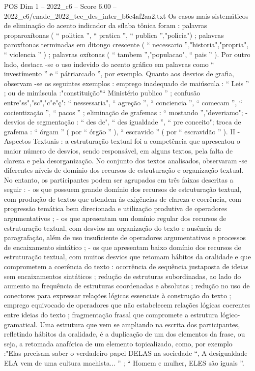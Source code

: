 \begin{textsample}{POS Dim 1 – 2022\_c6 – Score 6.00 – 2022\_c6/enade\_2022\_tec\_des\_inter\_b6c4af2aa2.txt}
Os casos mais sistemáticos de eliminação do acento indicador da sílaba tônica foram : palavras proparoxítonas ( “ politica ”, “ pratica ”, “ publica ”,"policia") ; palavras paroxítonas terminadas em ditongo crescente ( “ necessario ”,"historia","propria", “ violencia ” ) ; palavras oxítonas ( “ tambem ”,"populacao", “ pais ” ).
Por outro lado, destaca -se o uso indevido do acento gráfico em palavras como “ investímento ” e “ pátriarcado ”, por exemplo.
Quanto aos desvios de grafia, observam -se os seguintes exemplos : emprego inadequado de maiúscula : “ Leis ” ; ou de minúscula :"constituição"“ Ministério publico ” ; confusão entre"ss","sc","c"e"ç": “ nessessaria", “ agreção ”, “ conciencia ”, “ comecam ”, “ cocientização ”, “ pacos ” ; eliminação de grafemas : “ mostando ”,"deveriamo"; - desvios de segmentação : “ des de", “ des igualdade ”, “ pre conceito"; troca de grafema : “ órgam ” ( por “ órgão ” ), “ escravido ” ( por “ escravidão ” ).
II - Aspectos Textuais : a estruturação textual foi a competência que apresentou o maior número de desvios, sendo responsável, em alguns textos, pela falta de clareza e pela desorganização.
No conjunto dos textos analisados, observaram -se diferentes níveis de domínio dos recursos de estruturação e organização textual.
No entanto, os participantes podem ser agrupados em três faixas descritas a seguir : - os que possuem grande domínio dos recursos de estruturação textual, com produção de textos que atendem às exigências de clareza e coerência, com progressão temática bem direcionada e utilização produtiva de operadores argumentativos ; - os que apresentam um domínio regular dos recursos de estruturação textual, com desvios na organização do texto e ausência de paragrafação, além de uso insuficiente de operadores argumentativos e processos de encaixamento sintático ; - os que apresentam baixo domínio dos recursos de estruturação textual, com muitos desvios que retomam hábitos da oralidade e que comprometem a coerência do texto : ocorrência de sequência justaposta de ideias sem encaixamentos sintáticos ; redução de estruturas subordinadas, ao lado do aumento na frequência de estruturas coordenadas e absolutas ; redução no uso de conectores para expressar relações lógicas essenciais à construção do texto ; emprego equivocado de operadores que não estabelecem relações lógicas coerentes entre ideias do texto ; fragmentação frasal que compromete a estrutura lógico-gramatical.
Uma estrutura que vem se ampliando na escrita dos participantes, refletindo hábitos da oralidade, é a duplicação de um dos elementos da frase, ou seja, a retomada anafórica de um elemento topicalizado, como, por exemplo :"Elas precisam saber o verdadeiro papel DELAS na sociedade “, A desigualdade ELA vem de uma cultura machista... ” ; “ Homem e mulher, ELES são iguais ”.

\end{textsample}
